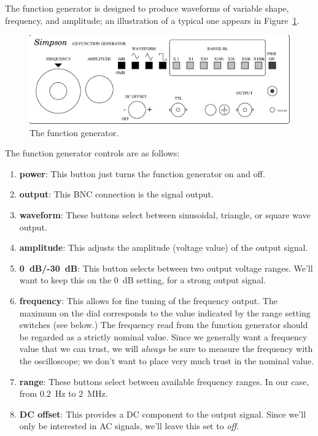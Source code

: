 The function generator is designed to produce waveforms of variable shape,
frequency, and amplitude; an illustration of a typical one appears in
Figure~\ref{fig:scope:functiongen}.
\begin{figure}[htb]
\centering \epsfxsize=14cm \includegraphics[scale=0.5]{4_oscilloscope/functiongen.eps}
\caption{The function generator.}
\label{fig:scope:functiongen}
\end{figure}
The function generator controls are as follows:

\begin{enumerate}

\item {\bf power}: This button just turns the function generator on and off.

\item {\bf output}: This BNC connection is the signal output.

\item {\bf waveform}: These buttons select between sinusoidal, triangle, or 
square wave output.

\item {\bf amplitude}: This adjusts the amplitude (voltage value) of the output
signal.

\item {\bf 0~dB/-30~dB}: This button selects between two output voltage ranges.
We'll want to keep this on the 0~dB setting, for a strong output signal.  

\item {\bf frequency}: This allows for fine tuning of the frequency output.
The maximum on the dial corresponds to the value indicated by the range
setting switches (see below.) The frequency read from the function 
generator should be regarded as a strictly nominal value. Since we generally 
want a frequency value that we can trust, we will {\it always} be sure to 
measure the frequency with the oscilloscope; we don't want to place very much 
trust in the nominal value.

\item {\bf range}: These buttons select between available frequency ranges. In
our case, from 0.2~Hz to 2~MHz.

\item {\bf DC offset}: This provides a DC component to the output signal. Since
we'll only be interested in AC signals, we'll leave this set to {\it off}.

\end{enumerate}

